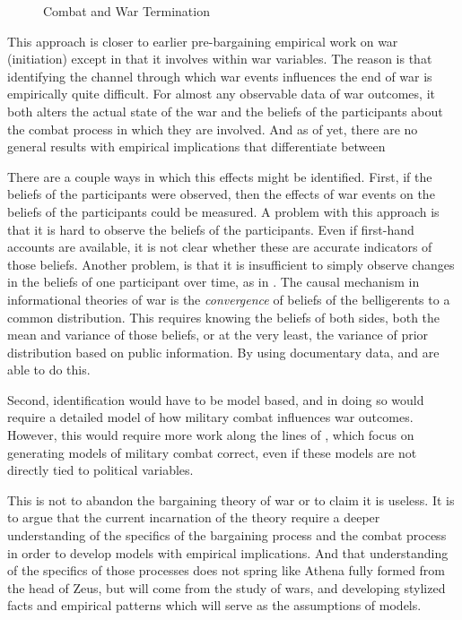 \begin{figure}[htpb]
  \centering
  
  \caption{Combat and War Termination}
  \label{bonds_battles:fig:combat-causal-diagram}
\end{figure}

This approach is closer to earlier pre-bargaining empirical work on war (initiation) except in that it involves within war variables. %
The reason is that identifying the channel through which war events influences the end of war is empirically quite difficult. %
For almost any observable data of war outcomes, it both alters the actual state of the war and the beliefs of the participants about the combat process in which they are involved. %
And as of yet, there are no general results with empirical implications that differentiate between

There are a couple ways in which this effects might be identified. %
First, if the beliefs of the participants were observed, then the effects of war events on the beliefs of the participants could be measured. %
A problem with this approach is that it is hard to observe the beliefs of the participants.
Even if first-hand accounts are available, it is not clear whether these are accurate indicators of those beliefs. %
Another problem, is that it is insufficient to simply observe changes in the beliefs of one participant over time, as in \textcite{Reiter2009}. %
The causal mechanism in informational theories of war is the \textit{convergence} of beliefs of the belligerents to a common distribution. %
This requires knowing the beliefs of both sides, both the mean and variance of those beliefs, or at the very least, the variance of prior distribution based on public information. %
By using documentary data, \textcite{Goemans2000} and \textcite{Reiter2009} are able to do this.

Second, identification would have to be model based, and in doing so would require a detailed model of how military combat influences war outcomes.
However, this would require more work along the lines of \textcite{Biddle2004}, which focus on generating models of military combat correct, even if these models are not directly tied to political variables.

This is not to abandon the bargaining theory of war or to claim it is useless.
It is to argue that the current incarnation of the theory require a deeper understanding of the specifics of the bargaining process and the combat process in order to develop models with empirical implications.
And that understanding of the specifics of those processes does not spring like Athena fully formed from the head of Zeus, but will come from the study of wars, and developing stylized facts and empirical patterns which will serve as the assumptions of models.

